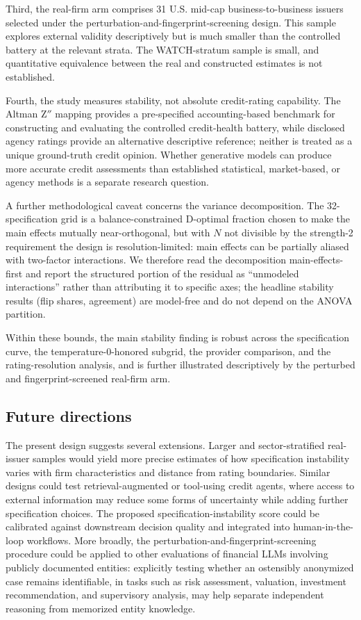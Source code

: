 \documentclass[a4paper,fleqn]{cas-sc}
\begin{document}
Third, the real-firm arm comprises 31 U.S. mid-cap business-to-business issuers selected under the
perturbation-and-fingerprint-screening design. This sample explores external validity descriptively but is much smaller than the
controlled battery at the relevant strata. The WATCH-stratum sample is small, and quantitative equivalence
between the real and constructed estimates is not established.

Fourth, the study measures stability, not absolute credit-rating capability. The Altman Z$''$ mapping
provides a pre-specified accounting-based benchmark for constructing and evaluating the controlled
credit-health battery, while disclosed agency ratings provide an alternative descriptive reference;
neither is treated as a unique ground-truth credit opinion. Whether generative models can produce more
accurate credit assessments than established statistical, market-based, or agency methods is a separate
research question.

A further methodological caveat concerns the variance decomposition. The 32-specification grid is a
balance-constrained D-optimal fraction chosen to make the main effects mutually near-orthogonal, but with
$N$ not divisible by the strength-2 requirement the design is resolution-limited: main effects can be
partially aliased with two-factor interactions. We therefore read the decomposition main-effects-first
and report the structured portion of the residual as ``unmodeled interactions'' rather than attributing
it to specific axes; the headline stability results (flip shares, agreement) are model-free and do not
depend on the ANOVA partition.

Within these bounds, the main stability finding is robust across the specification curve, the
temperature-0-honored subgrid, the provider comparison, and the rating-resolution analysis, and is further
illustrated descriptively by the perturbed and fingerprint-screened real-firm arm.

\subsection{Future directions}
The present design suggests several extensions. Larger and sector-stratified real-issuer samples would
yield more precise estimates of how specification instability varies with firm characteristics and
distance from rating boundaries. Similar designs could test retrieval-augmented or tool-using credit
agents, where access to external information may reduce some forms of uncertainty while adding further
specification choices. The proposed specification-instability score could be calibrated against downstream
decision quality and integrated into human-in-the-loop workflows. More broadly, the perturbation-and-fingerprint-screening
procedure could be applied to other evaluations of financial LLMs involving publicly documented entities:
explicitly testing whether an ostensibly anonymized case remains identifiable, in tasks such as risk
assessment, valuation, investment recommendation, and supervisory analysis, may help separate independent
reasoning from memorized entity knowledge.
\end{document}
